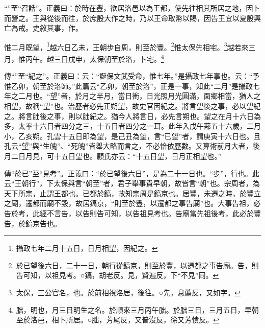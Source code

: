{\noindent\shu{}\fzkt “”至“召誥”。正義曰：於時在豐，欲居洛邑以為王都，使先往相其所居之地，因卜而營之。王與從後而往，於庶殷大作之時，乃以王命取幣以賜，因告王宜以夏殷興亡為戒。史敘其事，作。 \par}

惟二月既望，\footnote{攝政七年二月十五日，日月相望，因紀之。}越六日乙未，王朝步自周，則至於豐。\footnote{於已望後六日，二十一日，朝行從鎬京，則至於豐，以遷都之事告廟。告，則告可知，以祖見考。○鎬，胡老反。見，賢遍反，下“不見”同。}惟太保先相宅。\footnote{太保，三公官名，也。於前相視洛居，後往。○先，息薦反，又如字。}越若來三月，惟丙午。越三日戊申，太保朝至於洛，卜宅。\footnote{朏，明也，月三日明生之名。於順來三月丙午朏。於朏三日，三月五日，早朝至於洛邑，相卜所居。○朏，芳尾反，又普沒反，徐又芳憒反。}


{\noindent\zhuan{}\fzbyks 傳“”至“紀之”。正義曰：云：“誕保文武受命，惟七年。”是攝政七年事也。云：“予惟乙卯，朝至於洛師。”此篇云“乙卯，朝至於洛”，正是一事，知此“二月”是攝政七年之二月也。“望”者，於月之半月，當日衝，日光照月光圓滿，面鄉相當，猶人之相望，故稱“望”也。治歷者必先正朔望，故史官因紀之。將言望後之事，必以望紀之。將言朏後之事，則以朏紀之。猶今人將言日，必先言朔也。望之在月十六日為多，太率十六日者四分之三，十五日者四分之一耳。此年入戊午蔀五十六歲，二月小，乙亥朔。孔雲十五日即為望，是己丑為望，言“已望”者，謂庚寅十六日也。且孔云“望”與“生魄”、“死魄”皆舉大略而言之，不必恰依歷數。又算術前月大者，後月二日月見，可十五日望也。顧氏亦云：“十五日望，日月正相望也。” \par}

{\noindent\zhuan{}\fzbyks 傳“於已”至“見考”。正義曰：“於已望後六日”，是為二十一日也。“步”，行也。此云“王朝行”，下太保與言“朝至”者，君子舉事貴早朝，故皆言“朝”也。宗周者，為天下所宗，止謂王都也。已都於鎬，故知宗周是鎬京也。居豐，未遷之時，於豐立之廟，遷都而廟不毀，故居鎬京，“則至於豐，以遷都之事告廟”也。大事告祖，必告於考，此經不言告，以告則告可知，以告祖見考也。告廟當先祖後考，此必於豐告，於鎬京告也。 \par}

